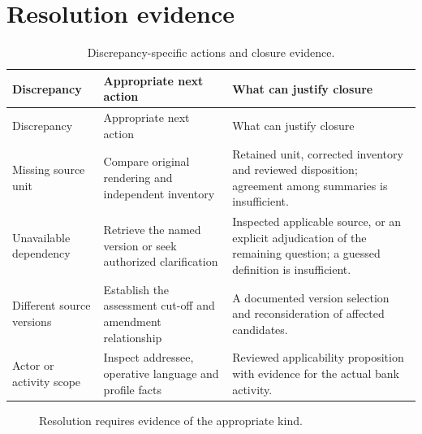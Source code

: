 \section{Resolution evidence}
\begin{longtable}{@{}P{27mm}P{56mm}P{65mm}@{}}
\caption{Discrepancy-specific actions and closure evidence.}\label{tab:resolution-matrix-detail}\\
\toprule
Discrepancy & Appropriate next action & What can justify closure\\\midrule\endfirsthead
\toprule Discrepancy & Appropriate next action & What can justify closure\\\midrule\endhead
Missing source unit & Compare original rendering and independent inventory & Retained unit, corrected inventory and reviewed disposition; agreement among summaries is insufficient.\\
Unavailable dependency & Retrieve the named version or seek authorized clarification & Inspected applicable source, or an explicit adjudication of the remaining question; a guessed definition is insufficient.\\
Different source versions & Establish the assessment cut-off and amendment relationship & A documented version selection and reconsideration of affected candidates.\\
Actor or activity scope & Inspect addressee, operative language and profile facts & Reviewed applicability proposition with evidence for the actual bank activity.\\
\bottomrule
\end{longtable}
\begingroup\normalsize
\begin{figure}[H]
\centering
{}
\caption{Resolution requires evidence of the appropriate kind.}\label{fig:gap-resolution-table}
\end{figure}

